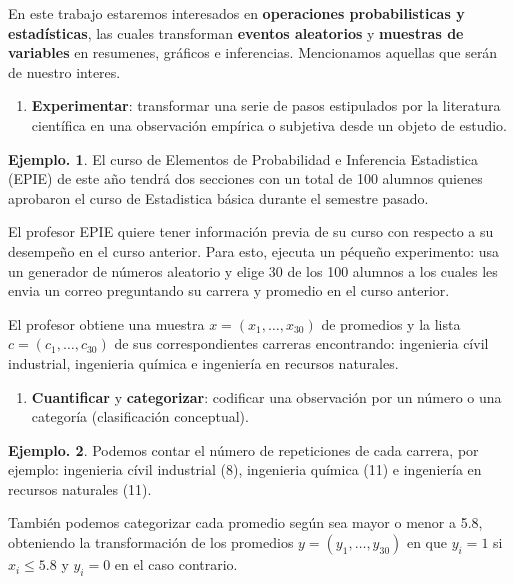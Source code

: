 \documentclass[]{book}
\providecommand{\tightlist}{%
  \setlength{\itemsep}{0pt}\setlength{\parskip}{0pt}}
\theoremstyle{definition}
\theoremstyle{definition}
\newtheorem{example}{Ejemplo.}[chapter]
\theoremstyle{definition}
\theoremstyle{remark}
\begin{document}
En este trabajo estaremos interesados en \textbf{operaciones
probabilisticas y estadísticas}, las cuales
transforman \textbf{eventos aleatorios} y \textbf{muestras de variables} en resumenes,
gráficos e inferencias. Mencionamos aquellas que serán
de nuestro interes.

\begin{enumerate}
\def\labelenumi{\arabic{enumi}.}
\tightlist
\item
  \textbf{Experimentar}: transformar una serie de pasos estipulados por
  la literatura científica en una observación empírica o
  subjetiva desde un objeto de estudio.
\end{enumerate}

\begin{example}
\protect\hypertarget{exm:unnamed-chunk-25}{}{\label{exm:unnamed-chunk-25} }
El curso de Elementos de Probabilidad e Inferencia Estadistica (EPIE) de este año tendrá dos secciones con un total
de 100 alumnos quienes aprobaron
el curso de Estadistica básica durante el semestre pasado.

El profesor EPIE quiere tener información previa de su curso con
respecto a su desempeño en el curso anterior. Para esto, ejecuta
un péqueño experimento: usa un generador de números aleatorio y
elige 30 de los 100 alumnos a los cuales les envia un correo
preguntando su carrera y promedio en el curso anterior.

El profesor obtiene una muestra \(x=(x_1,\ldots,x_{30})\) de
promedios y la lista \(c=(c_1,\ldots, c_{30})\) de sus
correspondientes carreras encontrando: ingenieria cívil industrial, ingenieria química e
ingeniería en recursos naturales.
\end{example}

\begin{enumerate}
\def\labelenumi{\arabic{enumi}.}
\setcounter{enumi}{1}
\tightlist
\item
  \textbf{Cuantificar} y \textbf{categorizar}: codificar una observación por un
  número o una categoría (clasificación conceptual).
\end{enumerate}

\begin{example}
\protect\hypertarget{exm:unnamed-chunk-26}{}{\label{exm:unnamed-chunk-26} }
Podemos contar el número de repeticiones de cada carrera, por ejemplo: ingenieria cívil industrial (8), ingenieria
química (11) e ingeniería en recursos naturales (11).

También podemos categorizar cada promedio según sea mayor o menor a 5.8, obteniendo la transformación de los promedios
\(y=(y_1,\ldots,y_{30})\) en que \(y_i=1\) si \(x_i\leq 5.8\) y \(y_i=0\) en el caso contrario.
\end{example}
\end{document}
